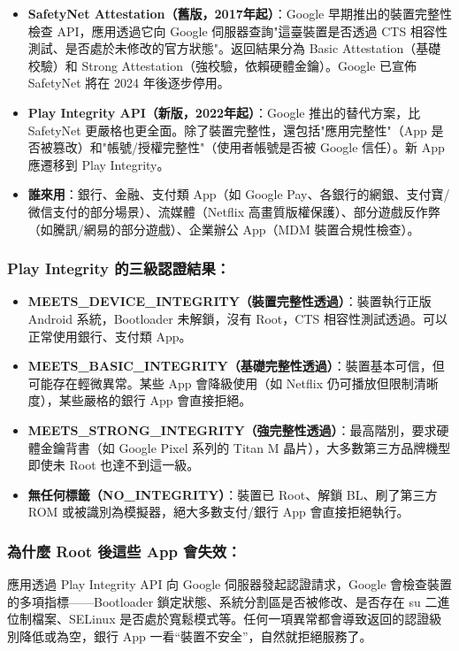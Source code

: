 \begin{itemize}
  \item \textbf{SafetyNet Attestation（舊版，2017年起）}：Google 早期推出的裝置完整性檢查 API，應用透過它向 Google 伺服器查詢"這臺裝置是否透過 CTS 相容性測試、是否處於未修改的官方狀態"。返回結果分為 Basic Attestation（基礎校驗）和 Strong Attestation（強校驗，依賴硬體金鑰）。Google 已宣佈 SafetyNet 將在 2024 年後逐步停用。
  \item \textbf{Play Integrity API（新版，2022年起）}：Google 推出的替代方案，比 SafetyNet 更嚴格也更全面。除了裝置完整性，還包括"應用完整性"（App 是否被篡改）和"帳號/授權完整性"（使用者帳號是否被 Google 信任）。新 App 應遷移到 Play Integrity。
  \item \textbf{誰來用}：銀行、金融、支付類 App（如 Google Pay、各銀行的網銀、支付寶/微信支付的部分場景）、流媒體（Netflix 高畫質版權保護）、部分遊戲反作弊（如騰訊/網易的部分遊戲）、企業辦公 App（MDM 裝置合規性檢查）。
\end{itemize}

\subsubsection*{Play Integrity 的三級認證結果：}

\begin{itemize}
  \item \textbf{MEETS\_DEVICE\_INTEGRITY（裝置完整性透過）}：裝置執行正版 Android 系統，Bootloader 未解鎖，沒有 Root，CTS 相容性測試透過。可以正常使用銀行、支付類 App。
  \item \textbf{MEETS\_BASIC\_INTEGRITY（基礎完整性透過）}：裝置基本可信，但可能存在輕微異常。某些 App 會降級使用（如 Netflix 仍可播放但限制清晰度），某些嚴格的銀行 App 會直接拒絕。
  \item \textbf{MEETS\_STRONG\_INTEGRITY（強完整性透過）}：最高階別，要求硬體金鑰背書（如 Google Pixel 系列的 Titan M 晶片），大多數第三方品牌機型即使未 Root 也達不到這一級。
  \item \textbf{無任何標籤（NO\_INTEGRITY）}：裝置已 Root、解鎖 BL、刷了第三方 ROM 或被識別為模擬器，絕大多數支付/銀行 App 會直接拒絕執行。
\end{itemize}

\subsubsection*{為什麼 Root 後這些 App 會失效：}

應用透過 Play Integrity API 向 Google 伺服器發起認證請求，Google 會檢查裝置的多項指標——Bootloader 鎖定狀態、系統分割區是否被修改、是否存在 su 二進位制檔案、SELinux 是否處於寬鬆模式等。任何一項異常都會導致返回的認證級別降低或為空，銀行 App 一看“裝置不安全”，自然就拒絕服務了。

